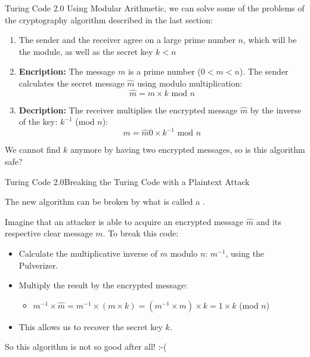 \begin{frame}{Turing Code 2.0}
  Using Modular Arithmetic, we can solve some of the problems of the cryptography algorithm described in the last section:

  \begin{enumerate}
    \item The sender and the receiver agree on a large prime number $n$, which will be the module, as well as the secret key $k < n$
    \item {\bf Encription:} The message $m$ is a prime number ($0 < m < n$). The sender calculates the secret message $\hat{m}$ using modulo multiplication:
    \begin{equation*}
      \hat{m} = m\times k \text{ mod }n
    \end{equation*}
    \item {\bf Decription:} The receiver multiplies the encrypted message $\hat{m}$ by the inverse of the key: $k^{-1}$ (mod $n$):
    \begin{equation*}
      m = \hat{m}0\times k^{-1} \text{ mod }n
    \end{equation*}
  \end{enumerate}
  We cannot find $k$ anymore by having two encrypted messages, so is this algorithm safe?
\end{frame}

\begin{frame}{Turing Code 2.0}{Breaking the Turing Code with a Plaintext Attack}

  The new algorithm can be broken by what is called a .\bigskip

  Imagine that an attacker is able to acquire an encrypted message $\hat{m}$ and its respective clear message $m$. To break this code:\bigskip

  \begin{itemize}
    \item Calculate the multiplicative inverse of $m$ modulo $n$: $m^{-1}$, using the Pulverizer.
    \item Multiply the result by the encrypted message:
    \begin{itemize}
      \item $m^{-1}\times \hat{m} = m^{-1}\times (m \times k) = (m^{-1} \times m) \times k = 1\times k$ (mod $n$)
    \end{itemize}
    \item This allows us to recover the secret key $k$.
  \end{itemize}\bigskip

  So this algorithm is not so good after all! :-(
\end{frame}
